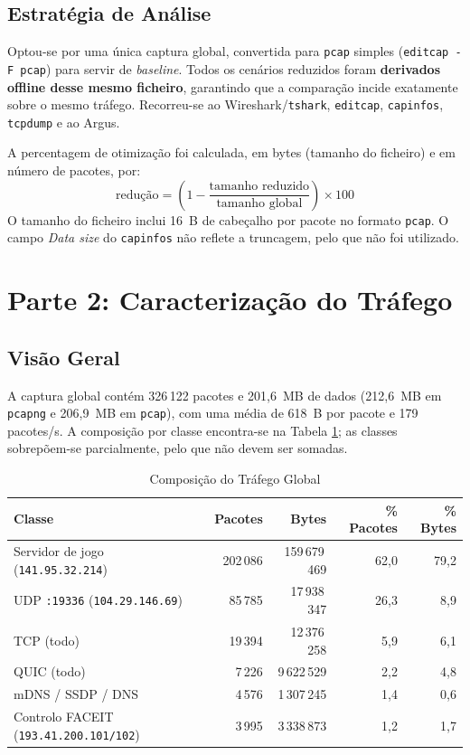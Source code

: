 \documentclass[11pt, a4paper]{article}
\begin{document}
\subsection{Estratégia de Análise}
Optou-se por uma única captura global, convertida para \texttt{pcap} simples (\texttt{editcap -F pcap}) para servir de \textit{baseline}. Todos os cenários reduzidos foram \textbf{derivados offline desse mesmo ficheiro}, garantindo que a comparação incide exatamente sobre o mesmo tráfego. Recorreu-se ao Wireshark/\texttt{tshark}, \texttt{editcap}, \texttt{capinfos}, \texttt{tcpdump} e ao Argus.

A percentagem de otimização foi calculada, em bytes (tamanho do ficheiro) e em número de pacotes, por:
\[
  \text{redução} = \left(1 - \frac{\text{tamanho reduzido}}{\text{tamanho global}}\right)\times 100
\]
O tamanho do ficheiro inclui 16~B de cabeçalho por pacote no formato \texttt{pcap}. O campo \textit{Data size} do \texttt{capinfos} não reflete a truncagem, pelo que não foi utilizado.

\section{Parte 2: Caracterização do Tráfego}

\subsection{Visão Geral}
A captura global contém 326\,122 pacotes e 201,6~MB de dados (212,6~MB em \texttt{pcapng} e 206,9~MB em \texttt{pcap}), com uma média de 618~B por pacote e 179 pacotes/s. A composição por classe encontra-se na Tabela \ref{tab:comp}; as classes sobrepõem-se parcialmente, pelo que não devem ser somadas.

\begin{table}[hbt!]
\centering
\caption{Composição do Tráfego Global}
\label{tab:comp}
\begin{tabular}{@{} >{\raggedright\arraybackslash}p{6.2cm} r r r r @{}}
\toprule
\textbf{Classe} & \textbf{Pacotes} & \textbf{Bytes} & \textbf{\% Pacotes} & \textbf{\% Bytes} \\
\midrule
Servidor de jogo (\texttt{141.95.32.214})    & 202\,086 & 159\,679\,469 & 62,0 & 79,2 \\
UDP \texttt{:19336} (\texttt{104.29.146.69}) &  85\,785 &  17\,938\,347 & 26,3 &  8,9 \\
TCP (todo)                                    &  19\,394 &  12\,376\,258 &  5,9 &  6,1 \\
QUIC (todo)                                   &   7\,226 &   9\,622\,529 &  2,2 &  4,8 \\
mDNS / SSDP / DNS                             &   4\,576 &   1\,307\,245 &  1,4 &  0,6 \\
Controlo FACEIT (\texttt{193.41.200.101/102}) &   3\,995 &   3\,338\,873 &  1,2 &  1,7 \\
\bottomrule
\end{tabular}
\end{table}
\end{document}
